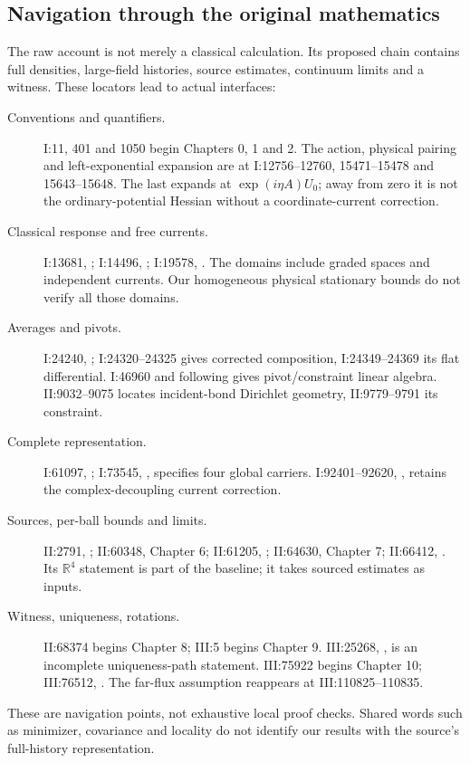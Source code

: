 \subsection{Navigation through the original mathematics}
\label{hrb-raw-map}

The raw account is not merely a classical calculation.
Its proposed chain contains full densities, large-field
histories, source estimates, continuum limits and a
witness. These locators lead to actual interfaces:
\begin{description}
\item[Conventions and quantifiers.]
I:11, 401 and 1050 begin Chapters 0, 1 and 2.
The action, physical pairing and left-exponential
expansion are at I:12756--12760, 15471--15478 and
15643--15648. The last expands at \(\exp(i\eta A)U_0\);
away from zero it is not the ordinary-potential
Hessian without a coordinate-current correction.
\item[Classical response and free currents.]
I:13681, ;
I:14496, ;
I:19578, .
The domains include graded spaces and independent
currents. Our homogeneous physical stationary
bounds do not verify all those domains.
\item[Averages and pivots.]
I:24240, ;
I:24320--24325 gives corrected composition,
I:24349--24369 its flat differential.
I:46960 and following gives pivot/constraint
linear algebra. II:9032--9075 locates incident-bond
Dirichlet geometry, II:9779--9791 its constraint.
\item[Complete representation.]
I:61097, ;
I:73545, ,
specifies four global carriers.
I:92401--92620, ,
retains the complex-decoupling current correction.
\item[Sources, per-ball bounds and limits.]
II:2791, ;
II:60348, Chapter 6;
II:61205, ;
II:64630, Chapter 7;
II:66412, .
Its \(\mathbb R^4\) statement is part of the baseline;
it takes sourced estimates as inputs.
\item[Witness, uniqueness, rotations.]
II:68374 begins Chapter 8; III:5 begins Chapter 9.
III:25268, , is an incomplete
uniqueness-path statement. III:75922 begins Chapter 10;
III:76512, .
The far-flux assumption reappears at
III:110825--110835.
\end{description}
These are navigation points, not exhaustive local
proof checks. Shared words such as minimizer, covariance
and locality do not identify our results with the
source's full-history representation.

